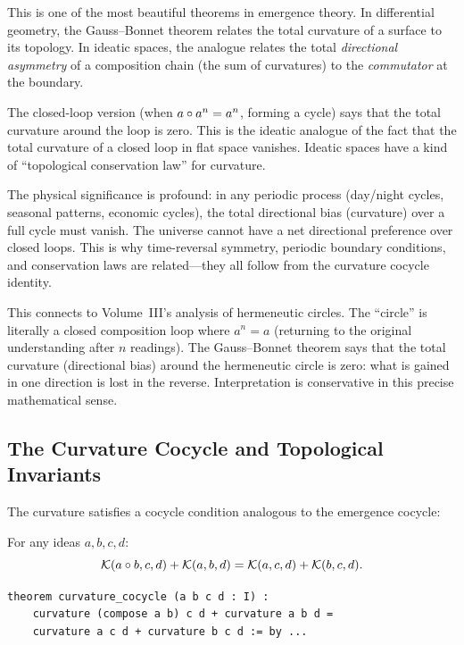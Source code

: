 \begin{interpretation}
This is one of the most beautiful theorems in emergence theory. In differential
geometry, the Gauss--Bonnet theorem relates the total curvature of a surface to
its topology. In ideatic spaces, the analogue relates the total \emph{directional
asymmetry} of a composition chain (the sum of curvatures) to the \emph{commutator}
at the boundary.

The closed-loop version (when $a \circ a^n = a^n$, forming a cycle) says that
the total curvature around the loop is zero. This is the ideatic analogue of the
fact that the total curvature of a closed loop in flat space vanishes. Ideatic
spaces have a kind of ``topological conservation law'' for curvature.

The physical significance is profound: in any periodic process (day/night cycles,
seasonal patterns, economic cycles), the total directional bias (curvature) over
a full cycle must vanish. The universe cannot have a net directional preference
over closed loops. This is why time-reversal symmetry, periodic boundary conditions,
and conservation laws are related---they all follow from the curvature cocycle
identity.

This connects to Volume~III's analysis of hermeneutic circles. The ``circle''
is literally a closed composition loop where $a^n = a$ (returning to the original
understanding after $n$ readings). The Gauss--Bonnet theorem says that the total
curvature (directional bias) around the hermeneutic circle is zero: what is
gained in one direction is lost in the reverse. Interpretation is conservative
in this precise mathematical sense.
\end{interpretation}

\subsection{The Curvature Cocycle and Topological Invariants}

The curvature satisfies a cocycle condition analogous to the emergence cocycle:

\begin{theorem}
\label{thm:curvature-cocycle}
For any ideas $a, b, c, d$:
\[
  \mathcal{K}(a \circ b, c, d) + \mathcal{K}(a, b, d) =
  \mathcal{K}(a, c, d) + \mathcal{K}(b, c, d).
\]
\end{theorem}

\begin{lstlisting}[caption={Curvature cocycle (IDT\_v3\_Emergence.lean)}]
theorem curvature_cocycle (a b c d : I) :
    curvature (compose a b) c d + curvature a b d =
    curvature a c d + curvature b c d := by ...
\end{lstlisting}

